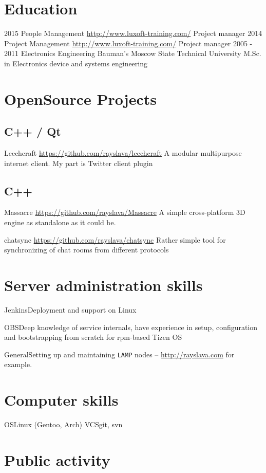\documentclass[11pt,a4paper]{moderncv}
\begin{document}
\section{Education}
  \cventry
    {2015}
    {People Management}
    {\url{http://www.luxoft-training.com/}}
    {}{}
    {Project manager}
  \cventry
    {2014}
    {Project Management}
    {\url{http://www.luxoft-training.com/}}
    {}{}
    {Project manager}
  \cventry
    {2005 - 2011}
    {Electronics Engineering}
    {Bauman's Moscow State Technical University}
    {}{}
    {M.Sc. in Electronics device and systems engineering}

\section{OpenSource Projects}
\subsection{C++ / Qt}
\cvitem
  {Leechcraft}
  {\url{https://github.com/rayslava/leechcraft}\newline{}
  A modular multipurpose internet client. My part is Twitter client plugin}

\subsection{C++}
\cvitem
  {Massacre}
  {\url{https://github.com/rayslava/Massacre}\newline{}
    A simple cross-platform 3D engine as standalone as it could be.}

\cvitem
  {chatsync}
  {\url{https://github.com/rayslava/chatsync}\newline{}
  Rather simple tool for synchronizing of chat rooms from different protocols}

\section{Server administration skills}
\cvitem
  {Jenkins}{Deployment and support on Linux}

\cvitem
  {OBS}{Deep knowledge of service internals, have experience in setup, configuration and bootstrapping from
    scratch for rpm-based Tizen OS}

\cvitem
  {General}{Setting up and maintaining \texttt{LAMP} nodes -- \url{http://rayslava.com} for example.}

\section{Computer skills}
  \cvitem
  {OS}{Linux (Gentoo, Arch)}
  \cvitem
  {VCS}{git, svn}

\section{Public activity}
\end{document}
